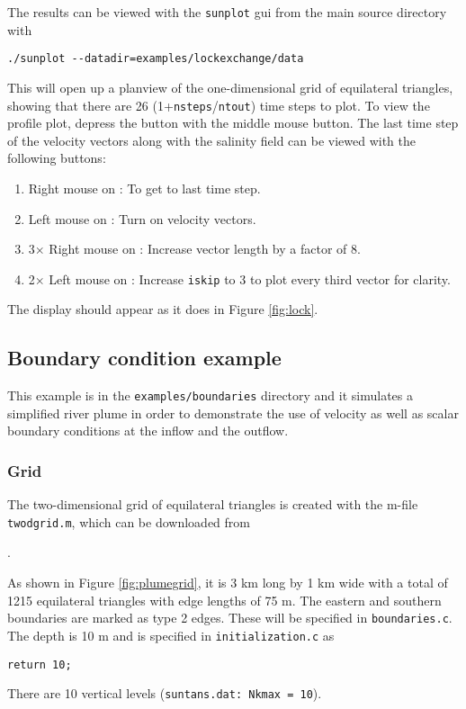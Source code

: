 The results can be viewed with the \verb+sunplot+ gui from the main source directory with
\begin{verbatim}
./sunplot --datadir=examples/lockexchange/data
\end{verbatim}
This will open up a planview of the one-dimensional grid of equilateral triangles, showing that
there are 26 (1+\verb+nsteps+/\verb+ntout+) time steps to plot.  To view the
profile plot, depress the  button with the middle mouse button.  The last time step
of the velocity vectors along with the salinity field can be viewed with the following buttons:
\begin{enumerate}
\item Right mouse on \button{$-->$}:  To get to last time step.
\item Left mouse on : Turn on velocity vectors.
\item 3$\times$ Right mouse on : Increase vector length by a factor of 8.
\item 2$\times$ Left mouse on \button{$>$}: Increase \verb+iskip+ to 3 to plot every third vector for clarity.
\end{enumerate}
The display should appear as it does in Figure \ref{fig:lock}.

\subsection{Boundary condition example} \label{sec:boundary_ex}

This example is in the \verb+examples/boundaries+ directory and it simulates a simplified
river plume in order to demonstrate the use of velocity as well as scalar boundary conditions
at the inflow and the outflow.

\subsubsection{Grid}

The two-dimensional grid of equilateral triangles is created with the m-file \verb+twodgrid.m+,
which can be downloaded from

\medskip
\noindent
\mfiledownload.

\medskip
\noindent
As shown in Figure \ref{fig:plumegrid}, it is 3 km long by 1 km wide with a total of 1215 equilateral triangles
with edge lengths of 75 m.  The eastern and southern boundaries
are marked as type 2 edges.  These will be specified in \verb+boundaries.c+.  The depth is
10 m and is specified in \verb+initialization.c+ as
\begin{verbatim}
return 10;
\end{verbatim}
There are 10 vertical levels (\verb+suntans.dat: Nkmax = 10+).

